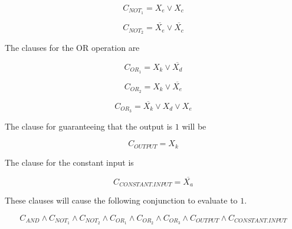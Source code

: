\documentclass[paper=a4, fontsize=11pt]{scrartcl} %
\numberwithin{equation}{section} %
\numberwithin{figure}{section} %
\numberwithin{table}{section} %
\begin{document}
\begin{enumerate}
$$
C_{NOT_1} = X_e \lor X_c
$$

$$
C_{NOT_2} = \overline{X_e} \lor \overline{X_c}
$$

The clauses for the OR operation are

$$
C_{OR_1} = X_k \lor \overline{X_d}
$$

$$
C_{OR_2} = X_k \lor \overline{X_e}
$$

$$
C_{OR_3} = \overline{X_k} \lor X_d \lor X_e
$$

The clause for guaranteeing that the output is $1$ will be

$$
C_{OUTPUT} = X_k
$$

The clause for the constant input is

$$
C_{CONSTANT.INPUT} = \overline{X_a}
$$ 

These clauses will cause the following conjunction to evaluate to $1$.

$$
C_{AND} \land C_{NOT_1} \land C_{NOT_2} \land C_{OR_1} \land C_{OR_2} \land C_{OR_3} \land C_{OUTPUT} \land {C_{CONSTANT.INPUT}}
$$

\end{enumerate}


\end{document}
